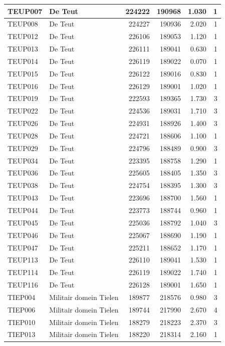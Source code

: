 \documentclass[11pt,]{book}
\begin{document}
\begin{table}
\begin{tabular}[t]{l|l|r|r|r|r}
\hline
TEUP007 & De Teut & 224222 & 190968 & 1.030 & 1\\
\hline
TEUP008 & De Teut & 224227 & 190936 & 2.020 & 1\\
\hline
TEUP012 & De Teut & 226106 & 189053 & 1.120 & 1\\
\hline
TEUP013 & De Teut & 226111 & 189041 & 0.630 & 1\\
\hline
TEUP014 & De Teut & 226119 & 189022 & 0.070 & 1\\
\hline
TEUP015 & De Teut & 226122 & 189016 & 0.830 & 1\\
\hline
TEUP016 & De Teut & 226129 & 189001 & 1.020 & 1\\
\hline
TEUP019 & De Teut & 222593 & 189365 & 1.730 & 3\\
\hline
TEUP022 & De Teut & 224536 & 189031 & 1.710 & 3\\
\hline
TEUP026 & De Teut & 224931 & 188926 & 1.400 & 3\\
\hline
TEUP028 & De Teut & 224721 & 188606 & 1.100 & 1\\
\hline
TEUP029 & De Teut & 224796 & 188489 & 0.900 & 3\\
\hline
TEUP034 & De Teut & 223395 & 188758 & 1.290 & 1\\
\hline
TEUP036 & De Teut & 225605 & 188405 & 1.350 & 3\\
\hline
TEUP038 & De Teut & 224754 & 188395 & 1.300 & 3\\
\hline
TEUP043 & De Teut & 223696 & 188700 & 1.560 & 1\\
\hline
TEUP044 & De Teut & 223773 & 188744 & 0.960 & 1\\
\hline
TEUP045 & De Teut & 225036 & 188792 & 1.040 & 3\\
\hline
TEUP046 & De Teut & 225067 & 188690 & 1.190 & 1\\
\hline
TEUP047 & De Teut & 225211 & 188652 & 1.170 & 1\\
\hline
TEUP113 & De Teut & 226110 & 189041 & 1.530 & 1\\
\hline
TEUP114 & De Teut & 226119 & 189022 & 1.740 & 1\\
\hline
TEUP116 & De Teut & 226128 & 189001 & 1.650 & 1\\
\hline
TIEP004 & Militair domein Tielen & 189877 & 218576 & 0.980 & 3\\
\hline
TIEP006 & Militair domein Tielen & 189744 & 217990 & 2.670 & 4\\
\hline
TIEP010 & Militair domein Tielen & 188279 & 218223 & 2.370 & 3\\
\hline
TIEP013 & Militair domein Tielen & 188220 & 218314 & 2.160 & 1\\

\end{tabular}
\end{table}
\end{document}
